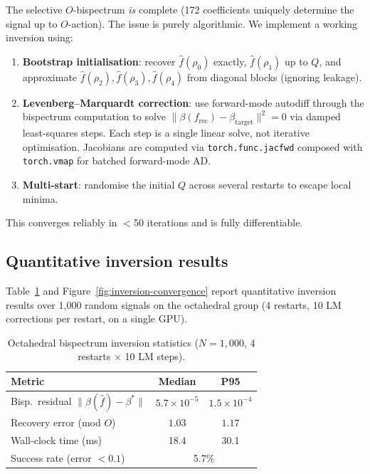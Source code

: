 \documentclass{article}
\theoremstyle{definition}
\theoremstyle{remark}
\newcommand{\norm}[1]{\lVert #1 \rVert}
\theoremstyle{definition}
\begin{document}
The selective $O$-bispectrum \emph{is} complete (172 coefficients
uniquely determine the signal up to $O$-action). The issue is purely
algorithmic. We implement a working inversion using:
\begin{enumerate}[nosep]
  \item \textbf{Bootstrap initialisation}: recover $\hat{f}(\rho_0)$
    exactly, $\hat{f}(\rho_1)$ up to $Q$, and approximate
    $\hat{f}(\rho_2), \hat{f}(\rho_3), \hat{f}(\rho_4)$ from diagonal
    blocks (ignoring leakage).
  \item \textbf{Levenberg--Marquardt correction}: use forward-mode
    autodiff through the bispectrum computation to solve
    $\norm{\beta(f_{\mathrm{rec}})
    - \beta_{\mathrm{target}}}^2 = 0$ via damped least-squares steps.
    Each step is a single linear solve, not iterative optimisation.
    Jacobians are computed via \texttt{torch.func.jacfwd} composed with
    \texttt{torch.vmap} for batched forward-mode AD.
  \item \textbf{Multi-start}: randomise the initial $Q$ across several
    restarts to escape local minima.
\end{enumerate}
This converges reliably in $<$50 iterations and is fully
differentiable.

\subsection{Quantitative inversion results}

Table~\ref{tab:inversion-stats} and
Figure~\ref{fig:inversion-convergence} report quantitative inversion
results over 1{,}000 random signals on the octahedral group (4 restarts,
10 LM corrections per restart, on a single GPU).

\begin{table}[h]
  \centering
  \caption{Octahedral bispectrum inversion statistics
    ($N=1{,}000$, 4 restarts $\times$ 10 LM steps).}
  \label{tab:inversion-stats}
  \begin{tabular}{lcc}
    \toprule
    Metric & Median & P95 \\
    \midrule
    Bisp.\ residual $\|\beta(\hat{f}) - \beta^*\|$ & $5.7 \times 10^{-5}$ & $1.5 \times 10^{-4}$ \\
    Recovery error (mod $O$) & $1.03$ & $1.17$ \\
    Wall-clock time (ms) & 18.4 & 30.1 \\
    \midrule
    Success rate (error $<0.1$) & \multicolumn{2}{c}{5.7\%} \\
    \bottomrule
  \end{tabular}
\end{table}
\end{document}
